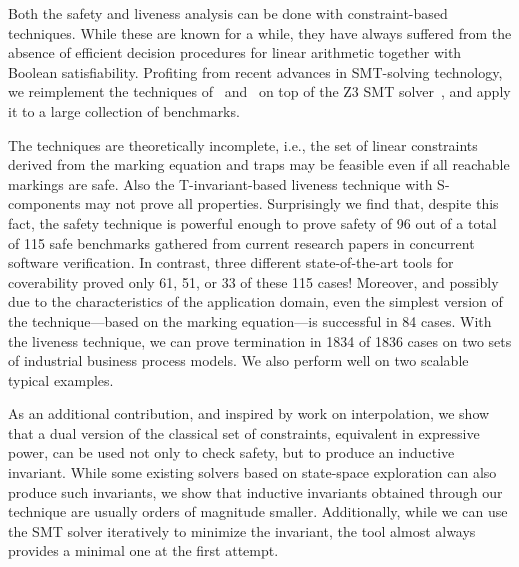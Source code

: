 
Both the safety and liveness analysis can be done with
constraint-based techniques. While these are known for a while, they have always
suffered from the absence of efficient decision procedures for 
linear arithmetic together with Boolean satisfiability.  
Profiting from recent advances in SMT-solving
technology, we reimplement the techniques of~\cite{EsparzaMelzer00}
and~\cite{EsparzaMelzer97}
on top of the Z3 SMT solver~\cite{MouraB08}, and apply it to a large 
collection of benchmarks.

The techniques are theoretically incomplete, i.e., the set of linear 
constraints derived from the marking equation and traps may be 
feasible even if all reachable markings are safe.
Also the T-invariant-based liveness technique with S-components may not prove all
properties.
Surprisingly we find that, despite this fact, the safety technique
is powerful enough to prove safety of 96 out of a total
of 115 safe benchmarks gathered from current research papers in concurrent software verification. 
In contrast, three different state-of-the-art tools for coverability
proved only 61, 51, or 33 of these 115 cases!
Moreover, and possibly due to the characteristics of the
application domain, even the simplest version of the
technique—based on the marking equation—is successful in 84 cases.
With the liveness technique, we can prove termination in
1834 of 1836 cases on two sets of industrial business process models.
We also perform well on two scalable typical examples. 

As an additional contribution, and inspired
by work on interpolation, we show that a dual version of the classical
set of constraints, equivalent in expressive power, can be used not
only to check safety, but to produce an inductive invariant.
While some existing solvers based on state-space
exploration can also produce such invariants, we show that inductive invariants obtained
through our technique are usually orders
of magnitude smaller.  Additionally, while we can use the 
SMT solver iteratively to minimize the invariant, the tool almost always
provides a minimal one at the first attempt.

